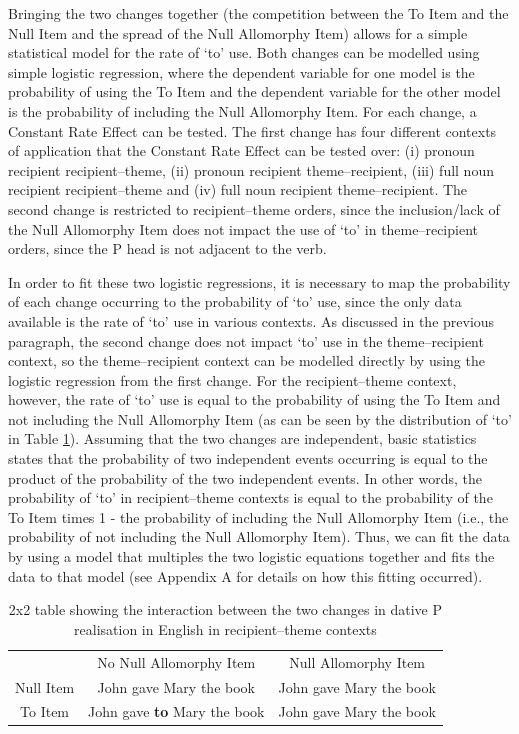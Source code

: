	Bringing the two changes together (the competition between the To Item and the Null Item and the spread of the Null Allomorphy Item) allows for a simple statistical model for the rate of `to' use. Both changes can be modelled using simple logistic regression, where the dependent variable for one model is the probability of using the To Item and the dependent variable for the other model is the probability of including the Null Allomorphy Item. For each change, a Constant Rate Effect can be tested. The first change has four different contexts of application that the Constant Rate Effect can be tested over: (i) pronoun recipient recipient--theme, (ii) pronoun recipient theme--recipient, (iii) full noun recipient recipient--theme and (iv) full noun recipient theme--recipient. The second change is restricted to recipient--theme orders, since the inclusion/lack of the Null Allomorphy Item does not impact the use of `to' in theme--recipient orders, since the P head is not adjacent to the verb. 

	In order to fit these two logistic regressions, it is necessary to map the probability of each change occurring to the probability of `to' use, since the only data available is the rate of `to' use in various contexts. As discussed in the previous paragraph, the second change does not impact `to' use in the theme--recipient context, so the theme--recipient context can be modelled directly by using the logistic regression from the first change. For the recipient--theme context, however, the rate of `to' use is equal to the probability of using the To Item and not including the Null Allomorphy Item (as can be seen by the distribution of `to' in Table \ref{tab:2x2int}). Assuming that the two changes are independent, basic statistics states that the probability of two independent events occurring is equal to the product of the probability of the two independent events. In other words, the probability of `to' in recipient--theme contexts is equal to the probability of the To Item times 1 - the probability of including the Null Allomorphy Item (i.e., the probability of not including the Null Allomorphy Item). Thus, we can fit the data by using a model that multiples the two logistic equations together and fits the data to that model (see Appendix A for details on how this fitting occurred).

	\begin{table}[ht!]
		\begin{tabular}{ccc}
					& No Null Allomorphy Item & Null Allomorphy Item\\
			Null Item	& John gave Mary the book & John gave Mary the book\\
			To Item 	& John gave \textbf{to} Mary the book & John gave Mary the book\\
		\end{tabular}
		\caption{2x2 table showing the interaction between the two changes in dative P realisation in English in recipient--theme contexts}
		\label{tab:2x2int}
	\end{table}

